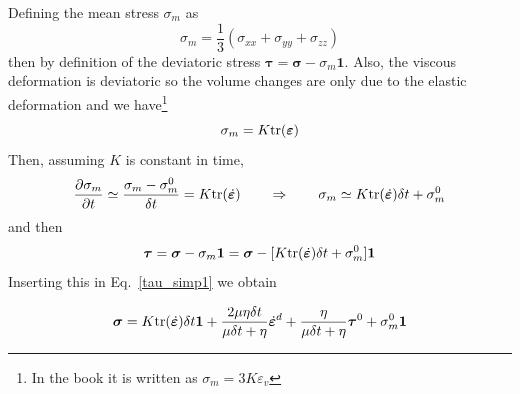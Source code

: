 Defining the mean stress $\sigma_m$ as
\[
\sigma_m = \frac13(\sigma_{xx}+\sigma_{yy}+\sigma_{zz})
\]
then by definition of the deviatoric stress 
$\bm\tau = \bm\sigma -\sigma_m {\bm 1} $. 
Also, the viscous deformation is deviatoric so the volume changes
are only due to the elastic deformation and we have\footnote{
In the book it is written as $\sigma_m = 3K \varepsilon_v $}
\[
\sigma_m 
= K {\rm tr}({\bm\varepsilon})
\]
Then, assuming $K$ is constant in time,
\[
\frac{\partial\sigma_m}{\partial t} 
\simeq 
\frac{\sigma_m - \sigma_m^0}{\delta t}
= K {\rm tr}(\dot{\bm\varepsilon})
\qquad
\Rightarrow
\qquad
\sigma_m \simeq K  {\rm tr}(\dot{\bm\varepsilon}) \delta t + \sigma_m^0
\]
and then
\[
\bm\tau = \bm\sigma -\sigma_m {\bm 1} 
= \bm\sigma - [K {\rm tr}(\dot{\bm\varepsilon}) \delta t + \sigma_m^0] {\bm 1}
\]
Inserting this in Eq.~\eqref{tau_simp1}
we obtain 
\begin{mdframed}[backgroundcolor=blue!5]
\begin{equation}
\bm \sigma 
=
K {\rm tr}(\dot{\bm\varepsilon}) \delta t {\bm 1}  +
\frac{2 \mu \eta\delta t}{ \mu\delta t +\eta} \dot{\bm\varepsilon}^d +
\frac{ \eta}{\mu\delta t + \eta}  \bm\tau^0 + \sigma_m^0 {\bm 1}
\label{f129:eq:sigma}
\end{equation}
\end{mdframed}

